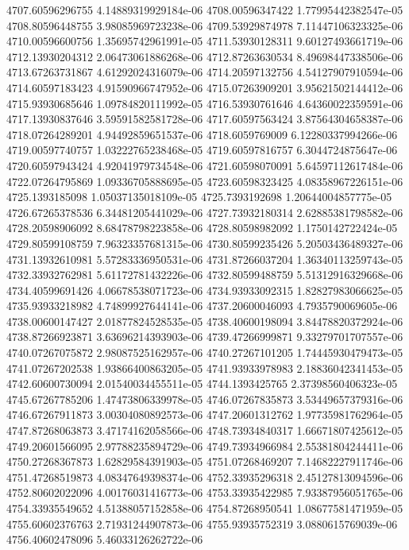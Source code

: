 {4707.60596296755 4.14889319929184e-06
4708.00596347422 1.77995442382547e-05
4708.80596448755 3.98085969723238e-06
4709.53929874978 7.11447106323325e-06
4710.00596600756 1.35695742961991e-05
4711.53930128311 9.60127493661719e-06
4712.13930204312 2.06473061886268e-06
4712.87263630534 8.49698447338506e-06
4713.67263731867 4.61292024316079e-06
4714.20597132756 4.54127907910594e-06
4714.60597183423 4.91590966747952e-06
4715.07263909201 3.95621502144412e-06
4715.93930685646 1.09784820111992e-05
4716.53930761646 4.64360022359591e-06
4717.13930837646 3.59591582581728e-06
4717.60597563424 3.87564304658387e-06
4718.07264289201 4.94492859651537e-06
4718.6059769009 6.12280337994266e-06
4719.00597740757 1.03222765238468e-05
4719.60597816757 6.3044724875647e-06
4720.60597943424 4.92041979734548e-06
4721.60598070091 5.64597112617484e-06
4722.07264795869 1.09336705888695e-05
4723.60598323425 4.08358967226151e-06
4725.1393185098 1.05037135018109e-05
4725.7393192698 1.20644004857775e-05
4726.67265378536 6.34481205441029e-06
4727.73932180314 2.62885381798582e-06
4728.20598906092 8.68478798223858e-06
4728.80598982092 1.1750142722424e-05
4729.80599108759 7.96323357681315e-06
4730.80599235426 5.20503436489327e-06
4731.13932610981 5.57283336950531e-06
4731.87266037204 1.36340113259743e-05
4732.33932762981 5.61172781432226e-06
4732.80599488759 5.51312916329668e-06
4734.40599691426 4.06678538071723e-06
4734.93933092315 1.82827983066625e-05
4735.93933218982 4.74899927644141e-06
4737.20600046093 4.7935790069605e-06
4738.00600147427 2.01877824528535e-05
4738.40600198094 3.84478820372924e-06
4738.87266923871 3.63696214393903e-06
4739.47266999871 9.33279701707557e-06
4740.07267075872 2.98087525162957e-06
4740.27267101205 1.74445930479473e-05
4741.07267202538 1.93866400863205e-05
4741.93933978983 2.18836042341453e-05
4742.60600730094 2.01540034455511e-05
4744.1393425765 2.37398560406323e-05
4745.67267785206 1.47473806339978e-05
4746.07267835873 3.53449657379316e-06
4746.67267911873 3.00304080892573e-06
4747.20601312762 1.97735981762964e-05
4747.87268063873 3.47174162058566e-06
4748.73934840317 1.66671807425612e-05
4749.20601566095 2.97788235894729e-06
4749.73934966984 2.55381804244411e-06
4750.27268367873 1.62829584391903e-05
4751.07268469207 7.14682227911746e-06
4751.47268519873 4.08347649398374e-06
4752.33935296318 2.45127813094596e-06
4752.80602022096 4.00176031416773e-06
4753.33935422985 7.93387956051765e-06
4754.33935549652 4.51388057152858e-06
4754.87268950541 1.08677581471959e-05
4755.60602376763 2.71931244907873e-06
4755.93935752319 3.0880615769039e-06
4756.40602478096 5.46033126262722e-06
}
